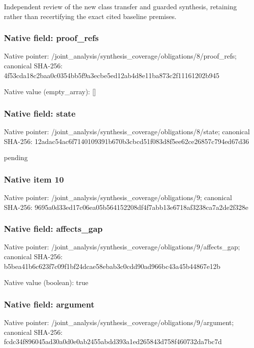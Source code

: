 \documentclass[10pt,a4paper]{article}
\begin{document}
\begingroup\raggedright\sloppy Independent review of the new class transfer and guarded synthesis,\allowbreak{} retaining rather than recertifying the exact cited baseline premises.\par\endgroup

\subsubsection{Native field: proof\_\allowbreak{}refs}
Native pointer: /joint\_\allowbreak{}analysis/synthesis\_\allowbreak{}coverage/obligations/8/proof\_\allowbreak{}refs; canonical SHA-256: 4f53cda18c2baa0c0354bb5f9a3ecbe5ed12ab4d8e11ba873c2f11161202b945

Native value (empty\_\allowbreak{}array): []

\subsubsection{Native field: state}
Native pointer: /joint\_\allowbreak{}analysis/synthesis\_\allowbreak{}coverage/obligations/8/state; canonical SHA-256: 12adac54ac6f7140109391b670b3cbcd51f083d8f5ee62ce26857c794ed67d36

\begingroup\raggedright\sloppy pending\par\endgroup

\subsubsection{Native item 10}
Native pointer: /joint\_\allowbreak{}analysis/synthesis\_\allowbreak{}coverage/obligations/9; canonical SHA-256: 9695a0d33ed17c06ea05b564152208df4f7abb13e6718af3238ca7a2de2f328e

\subsubsection{Native field: affects\_\allowbreak{}gap}
Native pointer: /joint\_\allowbreak{}analysis/synthesis\_\allowbreak{}coverage/obligations/9/affects\_\allowbreak{}gap; canonical SHA-256: b5bea41b6c623f7c09f1bf24dcae58ebab3c0cdd90ad966bc43a45b44867e12b

Native value (boolean): true

\subsubsection{Native field: argument}
Native pointer: /joint\_\allowbreak{}analysis/synthesis\_\allowbreak{}coverage/obligations/9/argument; canonical SHA-256: fcdc34f896045ad30a0d0e0ab2455abdd393a1ed265843d758f460732da7bc7d
\end{document}
